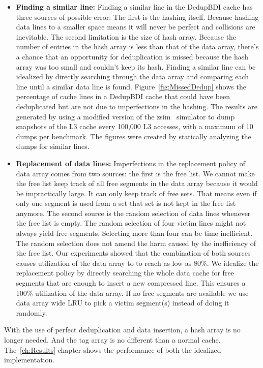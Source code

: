 \begin{itemize}
    \item \textbf{Finding a similar line:} Finding a similar line in the DedupBDI cache has three sources of possible error: The first is the hashing itself. Because hashing data lines to a smaller space means it will never be perfect and collisions are inevitable. The second limitation is the size of hash array. Because the number of entries in the hash array is less than that of the data array, there's a chance that an opportunity for deduplication is missed because the hash array was too small and couldn't keep its hash. Finding a similar line can be idealized by directly searching through the data array and comparing each line until a similar data line is found.
    Figure~\ref{fig:MissedDedup} shows the percentage of cache lines in a DedupBDI cache that could have been deduplicated but are not due to imperfections in the hashing. The results are generated by using a modified version of the zsim~\cite{zsim} simulator to dump snapshots of the L3 cache every 100,000 L3 accesses, with a maximum of 10 dumps per benchmark. The figures were created by statically analyzing the dumps for similar lines.
    \item \textbf{Replacement of data lines:} Imperfections in the replacement policy of data array comes from two sources: the first is the free list. We cannot make the free list keep track of all free segments in the data array because it would be impractically large. It can only keep track of free sets. That means even if only one segment is used from a set that set is not kept in the free list anymore. The second source is the random selection of data lines whenever the free list is empty. The random selection of four victim lines might not always yield free segments. Selecting more than four can be time inefficient. The random selection does not amend the harm caused by the inefficiency of the free list. Our experiments showed that the combination of both sources causes utilization of the data array to to reach as low as 80\%. We idealize the replacement policy by directly searching the whole data cache for free segments that are enough to insert a new compressed line. This ensures a 100\% utilization of the data array. If no free segments are available we use data array wide LRU to pick a victim segment(s) instead of doing it randomly.
\end{itemize}
With the use of perfect deduplication and data insertion, a hash array is no longer needed. And the tag array is no different than a normal cache. The~\ref{ch:Results} chapter shows the performance of both the idealized implementation.


